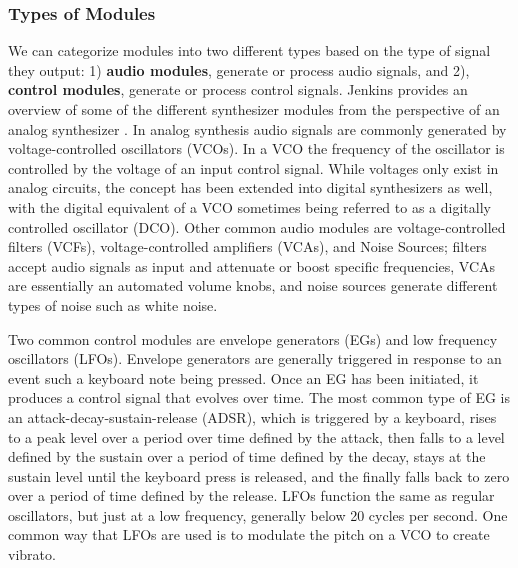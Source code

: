 \subsubsection{Types of Modules}
We can categorize modules into two different types based on the type of signal they output: 1) \textbf{audio modules}, generate or process audio signals, and 2), \textbf{control modules}, generate or process control signals. Jenkins provides an overview of some of the different synthesizer modules from the perspective of an analog synthesizer \cite{jenkins2019analog}. In analog synthesis audio signals are commonly generated by voltage-controlled oscillators (VCOs). In a VCO the frequency of the oscillator is controlled by the voltage of an input control signal. While voltages only exist in analog circuits, the concept has been extended into digital synthesizers as well, with the digital equivalent of a VCO sometimes being referred to as a digitally controlled oscillator (DCO). Other common audio modules are voltage-controlled filters (VCFs), voltage-controlled amplifiers (VCAs), and Noise Sources; filters accept audio signals as input and attenuate or boost specific frequencies, VCAs are essentially an automated volume knobs, and noise sources generate different types of noise such as white noise.

Two common control modules are envelope generators (EGs) and low frequency oscillators (LFOs). Envelope generators are generally triggered in response to an event such a keyboard note being pressed. Once an EG has been initiated, it produces a control signal that evolves over time. The most common type of EG is an attack-decay-sustain-release (ADSR), which is triggered by a keyboard, rises to a peak level over a period over time defined by the attack, then falls to a level defined by the sustain over a period of time defined by the decay, stays at the sustain level until the keyboard press is released, and the finally falls back to zero over a period of time defined by the release. LFOs function the same as regular oscillators, but just at a low frequency, generally below 20 cycles per second. One common way that LFOs are used is to modulate the pitch on a VCO to create vibrato.

